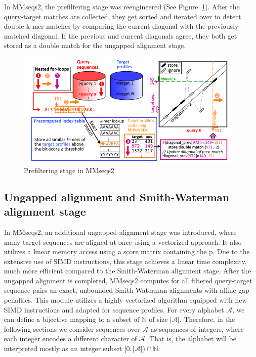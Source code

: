 \documentclass[twoside,a4paper,bsc]{master}
\newcommand{\Alpha}[0]{\mathcal{A}}
\newcommand{\Nats}{\mathbb{N}}
\begin{document}
In MMseqs2, the prefiltering stage was reengineered (See
Figure~\ref{fig:prefilterMMseqs2}). After the query-target matches are
collected, they get sorted and iterated over to detect double k-mer matches
by comparing the current diagonal with the previously matched diagonal. If
the previous and current diagonals agree, they both get stored as a double
match for the ungapped alignment stage.
\begin{figure}[t]
\begin{center}
\includegraphics[scale=0.7]{graphics/MMseqs2_prefilter.png}
\end{center}
\caption{Prefiltering stage in MMseqs2~\cite{steinegger2017mmseqs2}}
\label{fig:prefilterMMseqs2}
\end{figure}
\subsection{Ungapped alignment and Smith-Waterman alignment stage}
In MMseqs2, an additional ungapped alignment stage was introduced, where
many target sequences are aligned at once using a vectorized approach. It
also utilizes a linear memory access using a score matrix containing the p.
Due to the extensive use of SIMD instructions, this stage achieves a linear
time complexity, much more efficient compared to the Smith-Waterman
alignment stage.
After the ungapped alignment is completed, MMseqs2 computes for all
filtered
query-target sequence pairs an exact, unbounded Smith-Waterman alignments
with affine gap penalties. This module utilizes a highly vectorized
algorithm
equipped with new SIMD instructions and adapted for sequence profiles.
For every alphabet \(\Alpha\), we can define a bijective mapping to a
subset
of \(\Nats\) of size \(|\Alpha|\). Therefore, in the
following sections we consider sequences over \(\Alpha\) as sequences of
integers, where each integer encodes a different character of \(\Alpha\).
That is, the alphabet will be interpreted mostly as an integer
subset \([0,|\mathcal{A}|)\cap \Nats\).
\end{document}
